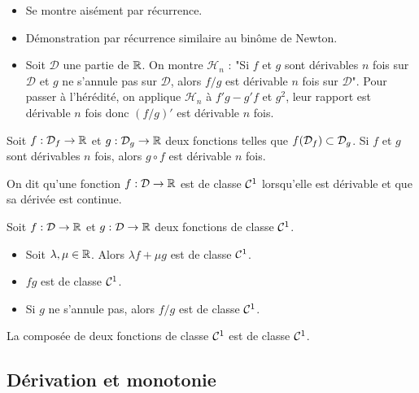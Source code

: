 \documentclass{magnoliaold}
\begin{document}
\begin{preuve}
\begin{itemize}
\item Se montre aisément par récurrence.
\item Démonstration par récurrence similaire au binôme de Newton.
\item Soit $\mathcal{D}$ une partie de $\mathbb{R}$. On montre $\mathcal{H}_n$ : "Si $f$ et $g$ sont dérivables $n$ fois sur $\mathcal{D}$ et $g$ ne s'annule pas sur $\mathcal{D}$, alors $f/g$ est dérivable $n$ fois sur $\mathcal{D}$".
Pour passer à l'hérédité, on applique $\mathcal{H}_n$ à $f'g-g'f$ et $g^2$, leur rapport est dérivable $n$ fois donc $(f/g)'$ est dérivable $n$ fois.
\end{itemize}
\end{preuve}

\begin{proposition}[utile=-3]
Soit $f:\mathcal{D}_f\to\mathbb{R}$ et $g:\mathcal{D}_g\to\mathbb{R}$ deux fonctions telles que
$f(\mathcal{D}_f)\subset\mathcal{D}_g$. Si $f$ et $g$ sont dérivables $n$ fois, alors $g\circ f$ est
dérivable $n$ fois.  
\end{proposition}

\begin{definition}
On dit qu'une fonction $f:\mathcal{D}\to\mathbb{R}$ est de classe $\mathcal{C}^{1}$ lorsqu'elle est
dérivable et que sa dérivée est continue.
\end{definition}

\begin{proposition}[utile=-3]
Soit $f:\mathcal{D}\to\mathbb{R}$ et $g:\mathcal{D}\to\mathbb{R}$ deux fonctions de classe $\mathcal{C}^{1}$.
\begin{itemize}
\item Soit $\lambda,\mu\in\mathbb{R}$. Alors $\lambda f+\mu g$ est de classe $\mathcal{C}^{1}$.
\item $fg$ est de classe $\mathcal{C}^{1}$.
\item Si $g$ ne s'annule pas, alors $f/g$ est de classe $\mathcal{C}^{1}$.
\end{itemize}
\end{proposition}

\begin{proposition}[utile=-3]
La composée de deux fonctions de classe $\mathcal{C}^{1}$ est de classe $\mathcal{C}^{1}$.
\end{proposition}

\subsection{Dérivation et monotonie}
\end{document}
